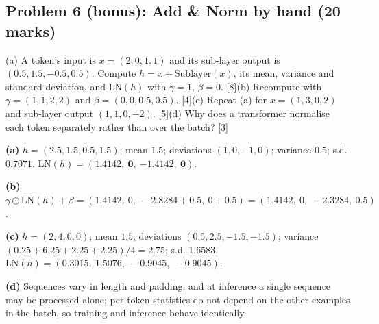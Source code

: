 \documentclass[11pt]{article}
\begin{document}
\subsection{Problem 6 (bonus): Add \& Norm by hand \normalfont\small\color{GreyN}(20 marks)}

\begin{prob}(a) A token's input is $x=(2,0,1,1)$ and its sub-layer output is $(0.5,1.5,-0.5,0.5)$. Compute $h=x+\text{Sublayer}(x)$, its mean, variance and standard deviation, and $\text{LN}(h)$ with $\gamma=1$, $\beta=0$. [8]\newline (b) Recompute with $\gamma=(1,1,2,2)$ and $\beta=(0,0,0.5,0.5)$. [4]\newline (c) Repeat (a) for $x=(1,3,0,2)$ and sub-layer output $(1,1,0,-2)$. [5]\newline (d) Why does a transformer normalise each token separately rather than over the batch? [3]\end{prob}

\begin{soln}\textbf{(a)} $h=(2.5,1.5,0.5,1.5)$; mean $1.5$; deviations $(1,0,-1,0)$; variance $0.5$; s.d. $0.7071$. $\text{LN}(h)=(\mathbf{1.4142},\ \mathbf{0},\ \mathbf{-1.4142},\ \mathbf{0})$.

\textbf{(b)} $\gamma\odot\text{LN}(h)+\beta=(1.4142,\ 0,\ -2.8284+0.5,\ 0+0.5)=(1.4142,\ 0,\ -2.3284,\ 0.5)$.

\textbf{(c)} $h=(2,4,0,0)$; mean $1.5$; deviations $(0.5,2.5,-1.5,-1.5)$; variance $(0.25+6.25+2.25+2.25)/4=2.75$; s.d. $1.6583$. $\text{LN}(h)=(0.3015,\ 1.5076,\ -0.9045,\ -0.9045)$.

\textbf{(d)} Sequences vary in length and padding, and at inference a single sequence may be processed alone; per-token statistics do not depend on the other examples in the batch, so training and inference behave identically.\end{soln}
\end{document}

